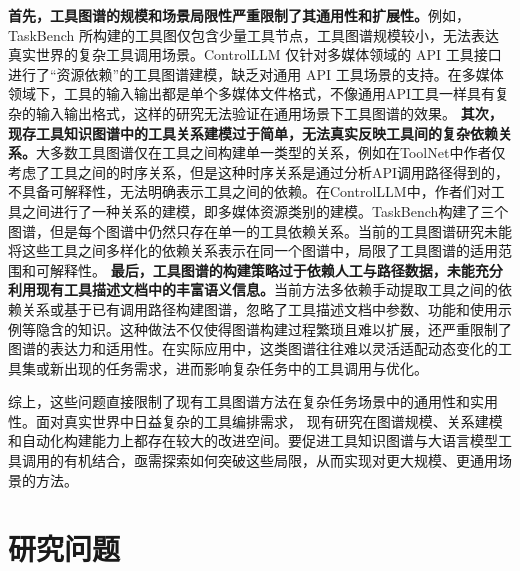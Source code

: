 \textbf{首先，工具图谱的规模和场景局限性严重限制了其通用性和扩展性。}例如，TaskBench\cite{shen2023taskbench} 所构建的工具图仅包含少量工具节点，工具图谱规模较小，无法表达真实世界的复杂工具调用场景。ControlLLM\cite{Liu2023a} 仅针对多媒体领域的 API 工具接口进行了“资源依赖”的工具图谱建模，缺乏对通用 API 工具场景的支持。在多媒体领域下，工具的输入输出都是单个多媒体文件格式，不像通用API工具一样具有复杂的输入输出格式，这样的研究无法验证在通用场景下工具图谱的效果。
\textbf{其次，现存工具知识图谱中的工具关系建模过于简单，无法真实反映工具间的复杂依赖关系。}大多数工具图谱仅在工具之间构建单一类型的关系，例如在ToolNet中作者仅考虑了工具之间的时序关系\cite{Liu2024}，但是这种时序关系是通过分析API调用路径得到的，不具备可解释性，无法明确表示工具之间的依赖。在ControlLLM\cite{Liu2023a}中，作者们对工具之间进行了一种关系的建模，即多媒体资源类别的建模。TaskBench\cite{shen2023taskbench}构建了三个图谱，但是每个图谱中仍然只存在单一的工具依赖关系。当前的工具图谱研究未能将这些工具之间多样化的依赖关系表示在同一个图谱中，局限了工具图谱的适用范围和可解释性。
\textbf{最后，工具图谱的构建策略过于依赖人工与路径数据，未能充分利用现有工具描述文档中的丰富语义信息。}当前方法多依赖手动提取工具之间的依赖关系或基于已有调用路径构建图谱，忽略了工具描述文档中参数、功能和使用示例等隐含的知识。这种做法不仅使得图谱构建过程繁琐且难以扩展，还严重限制了图谱的表达力和适用性。在实际应用中，这类图谱往往难以灵活适配动态变化的工具集或新出现的任务需求，进而影响复杂任务中的工具调用与优化。

综上，这些问题直接限制了现有工具图谱方法在复杂任务场景中的通用性和实用性。面对真实世界中日益复杂的工具编排需求，
现有研究在图谱规模、关系建模和自动化构建能力上都存在较大的改进空间。要促进工具知识图谱与大语言模型工具调用的有机结合，亟需探索如何突破这些局限，从而实现对更大规模、更通用场景的方法。

\section{研究问题}

